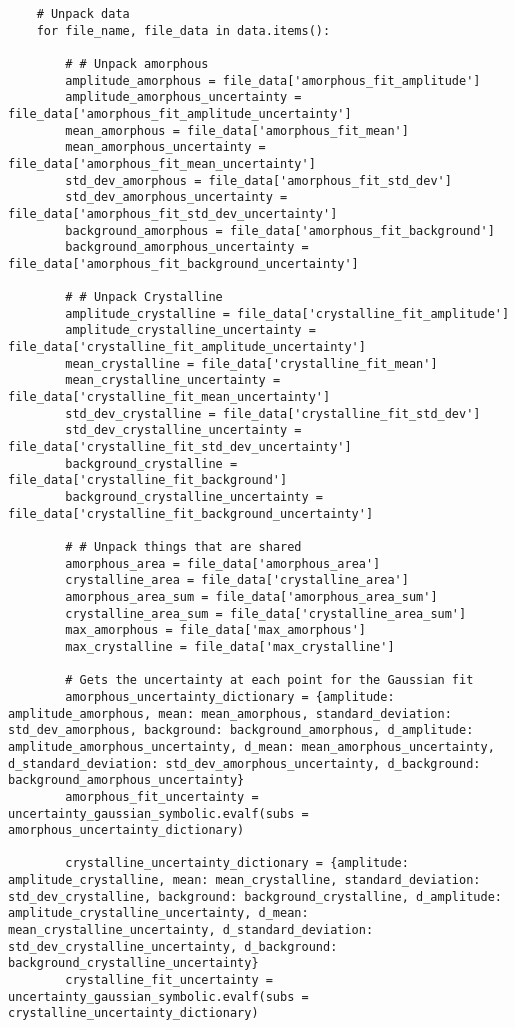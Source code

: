 \begin{small}
\begin{verbatim}
    # Unpack data
    for file_name, file_data in data.items():

        # # Unpack amorphous
        amplitude_amorphous = file_data['amorphous_fit_amplitude']
        amplitude_amorphous_uncertainty = file_data['amorphous_fit_amplitude_uncertainty']
        mean_amorphous = file_data['amorphous_fit_mean']
        mean_amorphous_uncertainty = file_data['amorphous_fit_mean_uncertainty']
        std_dev_amorphous = file_data['amorphous_fit_std_dev']
        std_dev_amorphous_uncertainty = file_data['amorphous_fit_std_dev_uncertainty']
        background_amorphous = file_data['amorphous_fit_background']
        background_amorphous_uncertainty = file_data['amorphous_fit_background_uncertainty']

        # # Unpack Crystalline
        amplitude_crystalline = file_data['crystalline_fit_amplitude']
        amplitude_crystalline_uncertainty = file_data['crystalline_fit_amplitude_uncertainty']
        mean_crystalline = file_data['crystalline_fit_mean']
        mean_crystalline_uncertainty = file_data['crystalline_fit_mean_uncertainty']
        std_dev_crystalline = file_data['crystalline_fit_std_dev']
        std_dev_crystalline_uncertainty = file_data['crystalline_fit_std_dev_uncertainty']
        background_crystalline = file_data['crystalline_fit_background']
        background_crystalline_uncertainty = file_data['crystalline_fit_background_uncertainty']
        
        # # Unpack things that are shared
        amorphous_area = file_data['amorphous_area']
        crystalline_area = file_data['crystalline_area']
        amorphous_area_sum = file_data['amorphous_area_sum']
        crystalline_area_sum = file_data['crystalline_area_sum']
        max_amorphous = file_data['max_amorphous']
        max_crystalline = file_data['max_crystalline']

        # Gets the uncertainty at each point for the Gaussian fit
        amorphous_uncertainty_dictionary = {amplitude: amplitude_amorphous, mean: mean_amorphous, standard_deviation: std_dev_amorphous, background: background_amorphous, d_amplitude: amplitude_amorphous_uncertainty, d_mean: mean_amorphous_uncertainty, d_standard_deviation: std_dev_amorphous_uncertainty, d_background: background_amorphous_uncertainty}
        amorphous_fit_uncertainty = uncertainty_gaussian_symbolic.evalf(subs = amorphous_uncertainty_dictionary)
        
        crystalline_uncertainty_dictionary = {amplitude: amplitude_crystalline, mean: mean_crystalline, standard_deviation: std_dev_crystalline, background: background_crystalline, d_amplitude: amplitude_crystalline_uncertainty, d_mean: mean_crystalline_uncertainty, d_standard_deviation: std_dev_crystalline_uncertainty, d_background: background_crystalline_uncertainty}
        crystalline_fit_uncertainty = uncertainty_gaussian_symbolic.evalf(subs = crystalline_uncertainty_dictionary)


\end{verbatim}
\end{small}
